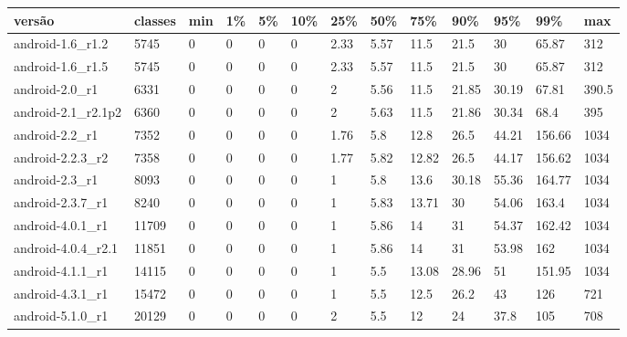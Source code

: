\begin{tabular}{|l|l|l|l|l|l|l|l|l|l|l|l|l|}
\hline
versão&classes&min&1\%&5\%&10\%&25\%&50\%&75\%&90\%&95\%&99\%&max\\
\hline
android-1.6\_r1.2&5745&0&0&0&0&2.33&5.57&11.5&21.5&30&65.87&312\\
\hline
android-1.6\_r1.5&5745&0&0&0&0&2.33&5.57&11.5&21.5&30&65.87&312\\
\hline
android-2.0\_r1&6331&0&0&0&0&2&5.56&11.5&21.85&30.19&67.81&390.5\\
\hline
android-2.1\_r2.1p2&6360&0&0&0&0&2&5.63&11.5&21.86&30.34&68.4&395\\
\hline
android-2.2\_r1&7352&0&0&0&0&1.76&5.8&12.8&26.5&44.21&156.66&1034\\
\hline
android-2.2.3\_r2&7358&0&0&0&0&1.77&5.82&12.82&26.5&44.17&156.62&1034\\
\hline
android-2.3\_r1&8093&0&0&0&0&1&5.8&13.6&30.18&55.36&164.77&1034\\
\hline
android-2.3.7\_r1&8240&0&0&0&0&1&5.83&13.71&30&54.06&163.4&1034\\
\hline
android-4.0.1\_r1&11709&0&0&0&0&1&5.86&14&31&54.37&162.42&1034\\
\hline
android-4.0.4\_r2.1&11851&0&0&0&0&1&5.86&14&31&53.98&162&1034\\
\hline
android-4.1.1\_r1&14115&0&0&0&0&1&5.5&13.08&28.96&51&151.95&1034\\
\hline
android-4.3.1\_r1&15472&0&0&0&0&1&5.5&12.5&26.2&43&126&721\\
\hline
android-5.1.0\_r1&20129&0&0&0&0&2&5.5&12&24&37.8&105&708\\
\hline
\end{tabular}
